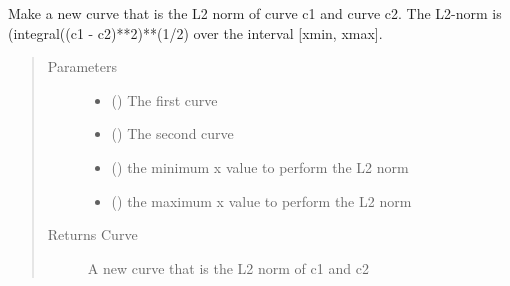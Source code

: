 \documentclass[letterpaper,10pt,english]{sphinxmanual}
\begin{document}

\begin{fulllineitems}
\label{\detokenize{pydv:pydvpy.l2}}
Make a new curve that is the L2 norm of curve c1 and curve c2.
The L2-norm is (integral((c1 - c2)**2)**(1/2) over the interval {[}xmin, xmax{]}.

\begin{sphinxVerbatim}[commandchars=\\\{\}]
   
\end{sphinxVerbatim}

\begin{sphinxVerbatim}[commandchars=\\\{\}]
     
\end{sphinxVerbatim}
\begin{quote}\begin{description}
\item[{Parameters}] \leavevmode\begin{itemize}
\item {} 
 ({\hyperref[\detokenize{pydv:curve.Curve}]{}}) \textendash{} The first curve

\item {} 
 ({\hyperref[\detokenize{pydv:curve.Curve}]{}}) \textendash{} The second curve

\item {} 
 () \textendash{} the minimum x value to perform the L2 norm

\item {} 
 () \textendash{} the maximum x value to perform the L2 norm

\end{itemize}

\item[{Returns Curve}] \leavevmode
A new curve that is the L2 norm of c1 and c2

\end{description}\end{quote}

\end{fulllineitems}
\end{document}
